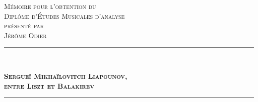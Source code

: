 \begin{titlepage}
\begin{bigcenter}

\vspace*{3.5cm}


\textsc{\large Mémoire pour l'obtention du}\\[0.2cm]
\textsc{\Large Diplôme d'Études Musicales d'analyse}\\[0.2cm]
\textsc{\large présenté par}\\[0.2cm]
\textsc{\Large Jérôme Odier}


\vspace{2.5cm}


\begin{minipage}{1.0\linewidth}
  \rule{\linewidth}{0.5mm}\\
  \begin{bigcenter}
    \textsc{\bfseries\huge Sergueï Mikhaïlovitch Liapounov,}\\[0.5cm]
    \textsc{\bfseries\huge entre Liszt et Balakirev}\\[0.5cm]
  \end{bigcenter}
  \rule{\linewidth}{0.5mm}\\
\end{minipage}


\end{bigcenter}
\end{titlepage}
